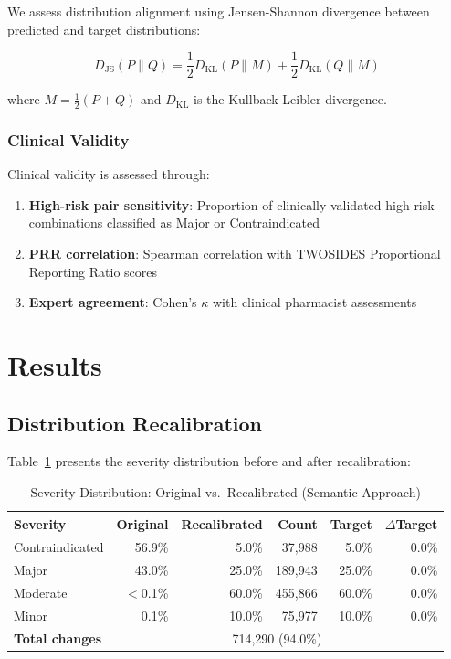 \documentclass[11pt,a4paper]{article}
\begin{document}
We assess distribution alignment using Jensen-Shannon divergence between predicted and target distributions:

\begin{equation}
D_{\text{JS}}(P \| Q) = \frac{1}{2} D_{\text{KL}}(P \| M) + \frac{1}{2} D_{\text{KL}}(Q \| M)
\end{equation}

where $M = \frac{1}{2}(P + Q)$ and $D_{\text{KL}}$ is the Kullback-Leibler divergence.

\subsubsection{Clinical Validity}

Clinical validity is assessed through:
\begin{enumerate}
    \item \textbf{High-risk pair sensitivity}: Proportion of clinically-validated high-risk combinations classified as Major or Contraindicated
    \item \textbf{PRR correlation}: Spearman correlation with TWOSIDES Proportional Reporting Ratio scores
    \item \textbf{Expert agreement}: Cohen's $\kappa$ with clinical pharmacist assessments
\end{enumerate}

\section{Results}

\subsection{Distribution Recalibration}

Table~\ref{tab:distribution_results} presents the severity distribution before and after recalibration:

\begin{table}[H]
\centering
\caption{Severity Distribution: Original vs.\ Recalibrated (Semantic Approach)}
\label{tab:distribution_results}
\begin{tabular}{@{}lrrrrr@{}}
\toprule
\textbf{Severity} & \textbf{Original} & \textbf{Recalibrated} & \textbf{Count} & \textbf{Target} & \textbf{$\Delta$Target} \\
\midrule
Contraindicated & 56.9\% & 5.0\% & 37,988 & 5.0\% & 0.0\% \\
Major & 43.0\% & 25.0\% & 189,943 & 25.0\% & 0.0\% \\
Moderate & $<$0.1\% & 60.0\% & 455,866 & 60.0\% & 0.0\% \\
Minor & 0.1\% & 10.0\% & 75,977 & 10.0\% & 0.0\% \\
\midrule
\textbf{Total changes} & \multicolumn{5}{c}{714,290 (94.0\%)} \\
\bottomrule
\end{tabular}
\end{table}
\end{document}
